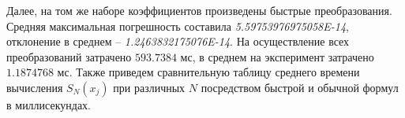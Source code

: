Далее, на том же наборе коэффициентов произведены быстрые преобразования.
Средняя максимальная погрешность составила \textit{5.59753976975058E-14}, отклонение в среднем -- \linebreak \textit{1.2463832175076E-14}.
На осуществление всех преобразований затрачено $593.7384$ мс, в среднем на эксперимент затрачено $1.1874768$ мс. Также приведем сравнительную таблицу среднего времени вычисления $S_N(x_j)$ при различных $N$ посредством быстрой и обычной формул в миллисекундах.

